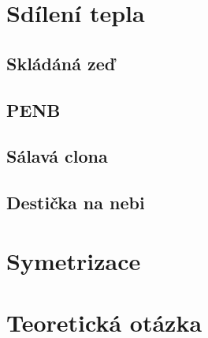 \documentclass{article}
\begin{document}
\maketitle
\tableofcontents
\newpage



\section{Sdílení tepla}

\subsection{Skládáná zeď}

\subsection{PENB}

\subsection{Sálavá clona}

\subsection{Destička na nebi}



\section{Symetrizace}





\section{Teoretická otázka}
\end{document}
